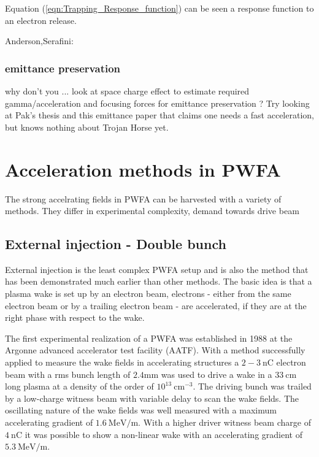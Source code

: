 Equation (\ref{eqn:Trapping_Response_function}) can be seen a response function to an electron release. 



Anderson,Serafini:\cite{AndersonVelocBunchPPRSTAB2005,serafini2001velocity}

\subsubsection{emittance preservation}
why don't you ... look at space charge effect to estimate required gamma/acceleration and focusing forces for emittance preservation ? Try looking at Pak's thesis and this emittance paper that claims one needs a fast acceleration, but knows nothing about Trojan Horse yet.
\section{Acceleration methods in PWFA}
The strong accelrating fields in PWFA can be harvested with a variety of methods. They differ in experimental complexity, demand towards drive beam 



\subsection{External injection - Double bunch}
External injection is the least complex PWFA setup and is also the method that has been demonstrated much earlier than other methods. The basic idea is that a plasma wake is set up by an electron beam, electrons - either from the same electron beam or by a trailing electron beam - are accelerated, if they are at the right phase with respect to the wake.

The first experimental realization of a PWFA was established in 1988 at the Argonne advanced accelerator test facility (AATF)\cite{rosenzweig1988experimental}. With a method successfully applied to measure the wake fields in accelerating structures
a $2-3\ \mathrm{nC}$ electron beam with a rms bunch length of $2.4 \mathrm{mm}$ was used to drive a wake in a $33\ \mathrm{cm} $ long plasma at a density of the order of $ 10^{13}\ \mathrm{cm}^{-3}$. The driving bunch was trailed by a low-charge witness beam with variable delay to scan the wake fields.
The oscillating nature of the wake fields was well measured with a maximum accelerating gradient of $1.6\ \mathrm{MeV/m}$. 
With a higher driver witness beam charge of $4\ \mathrm{nC}$ \cite{figueroa1988direct} it was possible to show a non-linear wake with an accelerating gradient of $5.3\ \mathrm{MeV/m}$. 

